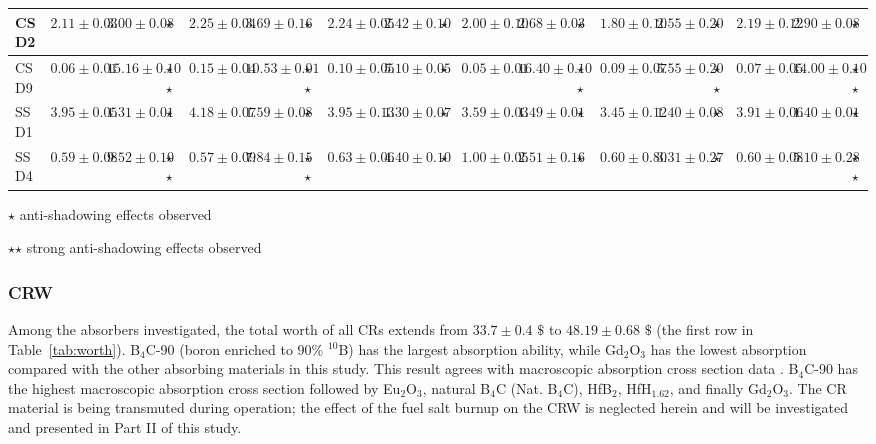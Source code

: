 \begin{sidewaystable}
\begin{tabularx}{\textwidth}{|p{1.8cm}|p{0.56cm}|p{0.5cm}|p{0.49cm}|p{0.56cm}|p{0.5cm}|p{0.49cm}| 
	p{0.56cm}|p{0.5cm}|p{0.49cm}|p{0.56cm}|p{0.5cm}|p{0.49cm}| 
	p{0.56cm}|p{0.5cm}|p{0.49cm}|p{0.56cm}|p{0.5cm}|p{0.49cm}|}
		\hline 
		CSD2			 &  $2.11\pm0.03$	&$3.00\pm0.08$	&	$\star$				& $2.25\pm0.04$   &$3.69\pm0.16$	&$\star$	&$2.24\pm0.05$	&$2.42\pm0.10$	&$\star$	&$2.00\pm0.10$	&$2.68\pm0.03$	&$\star$	&$1.80\pm0.10$	&$2.55\pm0.20$	&$\star$	&$2.19\pm0.12$	&$2.90\pm0.08$	&$\star$ \\
		\hline 
		CSD9			 &  $0.06\pm0.01$	&$15.16\pm0.10$	&	$\star$$\star$				& $0.15\pm0.04$   & $10.53\pm0.01$	&$\star$$\star$	&$0.10\pm0.05$	&$5.10\pm0.05$	&$\star$	&$0.05\pm0.01$	&$16.40\pm0.10$	&$\star$$\star$	&$0.09\pm0.07$	&$5.55\pm0.20$	&$\star$$\star$	&$0.07\pm0.05$	&$14.00\pm0.10$	&$\star$$\star$ \\ 
		\hline
		SSD1		 &  $3.95\pm0.05$	&$1.31\pm0.01$	&	$\star$		& $4.18\pm0.07$   &$1.59\pm0.08$	&$\star$	&$3.95\pm0.13$	&$1.30\pm0.07$	&$\star$	&$3.59\pm0.03$	&$1.49\pm0.01$	&$\star$	&$3.45\pm0.12$	&$1.40\pm0.08$	&$\star$	&$3.91\pm0.06$	&$1.40\pm0.01$&$\star$ \\
		\hline 
		SSD4		 &  $0.59\pm0.08$	& $9.52\pm0.10$	&	$\star$$\star$		&  $0.57\pm0.09$  &$7.84\pm0.15$	&$\star$$\star$	&$0.63\pm0.06$	&$4.40\pm0.10$	&$\star$	&$1.00\pm0.05$	&$2.51\pm0.16$	&$\star$	&$0.60\pm0.80$	&$3.31\pm0.27$	&$\star$	&$0.60\pm0.08$	&$5.10\pm0.28$	&$\star$$\star$ \\
		\hline
	\end{tabularx}
	\begin{tablenotes}
		\tiny
		\item  $\star$  anti-shadowing effects observed
		\item  $\star$$\star$ strong anti-shadowing effects observed
	\end{tablenotes}
	\label{tab:worth}
\end{sidewaystable}

\subsubsection{CRW} \label{CR_worth}

Among the absorbers investigated, the total worth of all CRs extends from $33.7\pm0.4$ $\$$ to $48.19\pm0.68$ 
$\$$ (the first row in Table~\ref{tab:worth}). B$_4$C-90 (boron enriched to 90\% $^{10}$B)
has the largest absorption ability, while Gd$_2$O$_3$ has the lowest 
absorption compared with the other absorbing materials in this study. This 
result agrees with macroscopic absorption cross section data 
\cite{guo2019optimized}. B$_4$C-90 has the highest macroscopic 
absorption cross section followed by Eu$_2$O$_3$, natural B$_4$C (Nat. B$_4$C), HfB$_2$, HfH$_{1.62}$, and 
finally Gd$_2$O$_3$. The CR material is being transmuted during 
operation; the effect of the fuel salt burnup on the CRW is neglected
herein and will be investigated and presented in Part II of this 
study.

